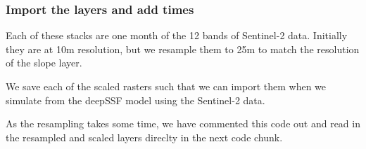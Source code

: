 \documentclass[
  letterpaper,
  DIV=11,
  numbers=noendperiod]{scrartcl}
\begin{document}
\subsubsection{Import the layers and add
times}\label{import-the-layers-and-add-times}

Each of these stacks are one month of the 12 bands of Sentinel-2 data.
Initially they are at 10m resolution, but we resample them to 25m to
match the resolution of the slope layer.

We save each of the scaled rasters such that we can import them when we
simulate from the deepSSF model using the Sentinel-2 data.

As the resampling takes some time, we have commented this code out and
read in the resampled and scaled layers direclty in the next code chunk.
\end{document}
